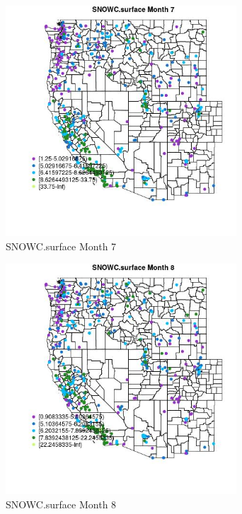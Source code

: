 \begin{figure} 
\centering  
\includegraphics[width=0.77\textwidth]{Code_Outputs/ML_input_report_ML_input_PM25_Step5_part_d_de_duplicated_aves_ML_input_MapObsMo7SNOWCsurface.jpg} 
\caption{\label{fig:ML_input_report_ML_input_PM25_Step5_part_d_de_duplicated_aves_ML_inputMapObsMo7SNOWCsurface}SNOWC.surface Month 7} 
\end{figure} 
 

\clearpage 

\begin{figure} 
\centering  
\includegraphics[width=0.77\textwidth]{Code_Outputs/ML_input_report_ML_input_PM25_Step5_part_d_de_duplicated_aves_ML_input_MapObsMo8SNOWCsurface.jpg} 
\caption{\label{fig:ML_input_report_ML_input_PM25_Step5_part_d_de_duplicated_aves_ML_inputMapObsMo8SNOWCsurface}SNOWC.surface Month 8} 
\end{figure} 
 

